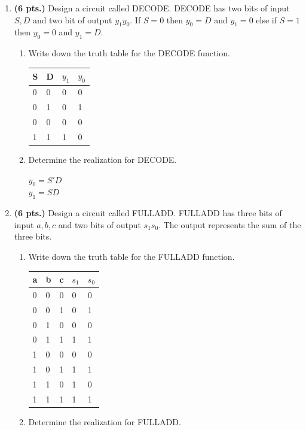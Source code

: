 \begin{enumerate}
\item {\bf (6 pts.)} Design a circuit called DECODE.  DECODE has two bits of 
input $S, D$ and two bit of output $y_1 y_0$.  If $S=0$ then $y_0=D$ and 
$y_1=0$ else if $S=1$ then $y_0=0$ and $y_1 = D$.
\begin{enumerate}
        \item Write down the truth table for the DECODE function.


\begin{solution}{
	\begin{tabular}{l|l||l|l}
	S & D & $y_1$ & $y_0$ \\ \hline
	0 & 0 & 0   & 0   \\ \hline
	0 & 1 & 0   & 1   \\ \hline
	0 & 0 & 0   & 0   \\ \hline
	1 & 1 & 1   & 0   \\ 
	\end{tabular}
} \end{solution}
        \item Determine the \SOPmin realization for DECODE.


\begin{solution}{
$y_0 = S'D$\\
$y_1 = S D$
} \end{solution}
\end{enumerate}

\item {\bf (6 pts.)} Design a circuit called FULLADD.  FULLADD has 
three bits of input $a,b,c$ and two bits of output $s_1 s_0$.  The output 
represents the sum of the three bits.
\begin{enumerate}
        \item Write down the truth table for the FULLADD function.


\begin{solution}{
	\begin{tabular}{l|l|l|l|l}
	a & b & c & $s_1$ & $s_0$ \\ \hline
	0 & 0 & 0 & 0   & 0   \\ \hline
	0 & 0 & 1 & 0   & 1   \\ \hline
	0 & 1 & 0 & 0   & 0   \\ \hline
	0 & 1 & 1 & 1   & 1   \\ \hline
	1 & 0 & 0 & 0   & 0   \\ \hline
	1 & 0 & 1 & 1   & 1   \\ \hline
	1 & 1 & 0 & 1   & 0   \\ \hline
	1 & 1 & 1 & 1   & 1   \\ 
\end{tabular}
} \end{solution}
        \item Determine the \SOPmin realization for FULLADD.


\end{enumerate}
\end{enumerate}
